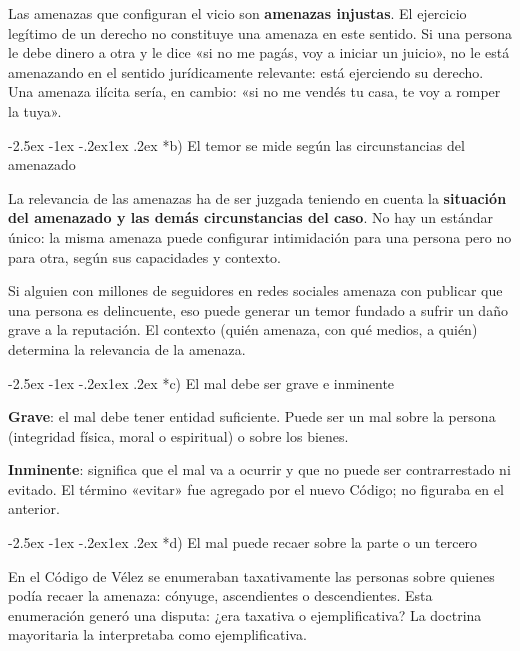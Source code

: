 \documentclass[12pt,oneside]{book}
\makeatletter
\renewcommand\subsection{\@startsection{subsection}{2}{\z@}%
  {-2.5ex \@plus -1ex \@minus -.2ex}{1ex \@plus .2ex}%
  {\normalfont\normalsize\bfseries}}
\makeatother
\begin{document}
Las amenazas que configuran el vicio son \textbf{amenazas injustas}. El ejercicio legítimo de un derecho no constituye una amenaza en este sentido. Si una persona le debe dinero a otra y le dice «si no me pagás, voy a iniciar un juicio», no le está amenazando en el sentido jurídicamente relevante: está ejerciendo su derecho. Una amenaza ilícita sería, en cambio: «si no me vendés tu casa, te voy a romper la tuya».

\subsection*{b) El temor se mide según las circunstancias del amenazado}

La relevancia de las amenazas ha de ser juzgada teniendo en cuenta la \textbf{situación del amenazado y las demás circunstancias del caso}. No hay un estándar único: la misma amenaza puede configurar intimidación para una persona pero no para otra, según sus capacidades y contexto.

\begin{ejemplo}
Si alguien con millones de seguidores en redes sociales amenaza con publicar que una persona es delincuente, eso puede generar un temor fundado a sufrir un daño grave a la reputación. El contexto (quién amenaza, con qué medios, a quién) determina la relevancia de la amenaza.
\end{ejemplo}

\subsection*{c) El mal debe ser grave e inminente}

\textbf{Grave}: el mal debe tener entidad suficiente. Puede ser un mal sobre la persona (integridad física, moral o espiritual) o sobre los bienes.

\textbf{Inminente}: significa que el mal va a ocurrir y que no puede ser contrarrestado ni evitado. El término «evitar» fue agregado por el nuevo Código; no figuraba en el anterior.

\subsection*{d) El mal puede recaer sobre la parte o un tercero}

En el Código de Vélez se enumeraban taxativamente las personas sobre quienes podía recaer la amenaza: cónyuge, ascendientes o descendientes. Esta enumeración generó una disputa: ¿era taxativa o ejemplificativa? La doctrina mayoritaria la interpretaba como ejemplificativa.
\end{document}
